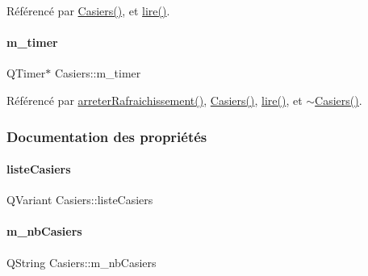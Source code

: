 Référencé par \hyperlink{class_casiers_ae9620f81e704a989f37b5b86e779e3df}{Casiers()}, et \hyperlink{class_casiers_a7b1d58f40217ef13a5dd0d966df38c9a}{lire()}.

\mbox{\label{class_casiers_a2e2ee8b7f70d1c22acca56257d257ae6}} 
\paragraph{\texorpdfstring{m\+\_\+timer}{m\_timer}}
{\footnotesize\ttfamily Q\+Timer$\ast$ Casiers\+::m\+\_\+timer\hspace{0.3cm}{\ttfamily [private]}}



Référencé par \hyperlink{class_casiers_ad9a69a4e68885d87318188102f57fdd6}{arreter\+Rafraichissement()}, \hyperlink{class_casiers_ae9620f81e704a989f37b5b86e779e3df}{Casiers()}, \hyperlink{class_casiers_a7b1d58f40217ef13a5dd0d966df38c9a}{lire()}, et \hyperlink{class_casiers_a12018a7daf2c2ce7652ccedbefc545cc}{$\sim$\+Casiers()}.



\subsubsection{Documentation des propriétés}
\mbox{\label{class_casiers_a936c4711e83f6577852a72909731fd89}} 
\paragraph{\texorpdfstring{liste\+Casiers}{listeCasiers}}
{\footnotesize\ttfamily Q\+Variant Casiers\+::liste\+Casiers\hspace{0.3cm}{\ttfamily [read]}}

\mbox{\label{class_casiers_a7c4b1df1f2e320c22489234fee991f18}} 
\paragraph{\texorpdfstring{m\+\_\+nb\+Casiers}{m\_nbCasiers}}
{\footnotesize\ttfamily Q\+String Casiers\+::m\+\_\+nb\+Casiers\hspace{0.3cm}{\ttfamily [read]}}



